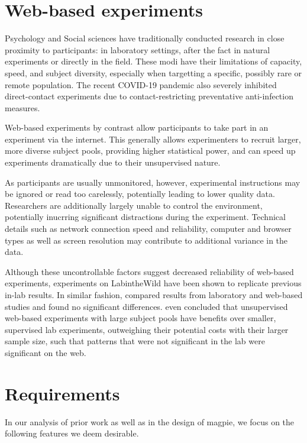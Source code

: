 \documentclass[a4paper,10pt]{paper}
\begin{document}
\section{Web-based experiments}
Psychology and Social sciences have traditionally conducted research in close proximity to participants: in laboratory settings, after the fact in natural experiments or directly in the field. These modi have their limitations of capacity, speed, and subject diversity, especially when targetting a specific, possibly rare or remote population. The recent COVID-19 pandemic also severely inhibited direct-contact experiments due to contact-restricting preventative anti-infection measures.

Web-based experiments by contrast allow participants to take part in an experiment via the internet. This generally allows experimenters to recruit larger, more diverse subject pools, providing higher statistical power, and can speed up experiments dramatically due to their unsupervised nature.

As participants are usually unmonitored, however, experimental instructions may be ignored or read too carelessly, potentially leading to lower quality data. Researchers are additionally largely unable to control the environment, potentially inucrring significant distractions during the experiment. Technical details such as network connection speed and reliability, computer and browser types as well as screen resolution may contribute to additional variance in the data.

Although these uncontrollable factors suggest decreased reliability of web-based experiments, experiments on LabintheWild have been shown to replicate previous in-lab results. \citep{Gajos2015} In similar fashion, \citet{Schoeffler2013} compared results from laboratory and web-based studies and found no significant differences. \citet{RRMWSC2013} even concluded that unsupervised web-based experiments with large subject pools have benefits over smaller, supervised lab experiments, outweighing their potential costs with their larger sample size, such that patterns that were not significant in the lab were significant on the web.

\section{Requirements}
In our analysis of prior work as well as in the design of magpie, we focus on the following features we deem desirable.
\end{document}
